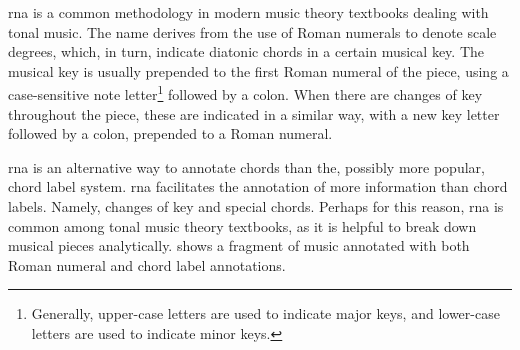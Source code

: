

\gls{rna} is a common methodology in modern music theory
textbooks dealing with tonal music. The name derives from
the use of Roman numerals to denote scale degrees, which, in
turn, indicate diatonic chords in a certain musical key. The
musical key is usually prepended to the first Roman numeral
of the piece, using a case-sensitive note
letter\footnote{Generally, upper-case letters are used to
indicate major keys, and lower-case letters are used to
indicate minor keys.} followed by a colon. When there are
changes of key throughout the piece, these are indicated in
a similar way, with a new key letter followed by a colon,
prepended to a Roman numeral.

\gls{rna} is an alternative way to annotate chords than the,
possibly more popular, chord label system. \gls{rna}
facilitates the annotation of more information than chord
labels. Namely, changes of key and special chords. Perhaps
for this reason, \gls{rna} is common among tonal music
theory textbooks, as it is helpful to break down musical
pieces analytically.  shows a fragment of
music annotated with both Roman numeral and chord label
annotations.

